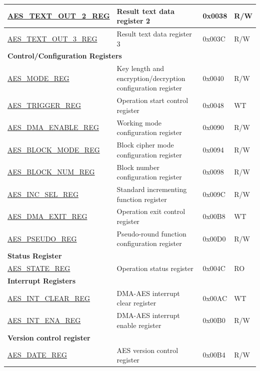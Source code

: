 \begin{longtable}{ | p{6cm} | p{7.2cm} | p{1.3cm} | p{1cm} | }
    \hyperref[regdesc:AESTEXTOUTnREG]{AES\_TEXT\_OUT\_2\_REG} & Result text data register 2 & 0x0038 & R/W \\ \hline
    \hyperref[regdesc:AESTEXTOUTnREG]{AES\_TEXT\_OUT\_3\_REG} & Result text data register 3 & 0x003C & R/W \\ \hline
    \multicolumn{4}{|l|}{\textbf{Control/Configuration Registers}} \\ \hline
    \hyperref[regdesc:AESMODEREG]{AES\_MODE\_REG} & Key length and encryption/decryption configuration register & 0x0040 & R/W \\ \hline
    \hyperref[regdesc:AESTRIGGERREG]{AES\_TRIGGER\_REG} & Operation start control register & 0x0048 & WT \\ \hline
    \hyperref[regdesc:AESDMAENABLEREG]{AES\_DMA\_ENABLE\_REG} & Working mode configuration register & 0x0090 & R/W \\ \hline
    \hyperref[regdesc:AESBLOCKMODEREG]{AES\_BLOCK\_MODE\_REG} & Block cipher mode configuration register & 0x0094 & R/W \\ \hline
    \hyperref[regdesc:AESBLOCKNUMREG]{AES\_BLOCK\_NUM\_REG} & Block number configuration register & 0x0098 & R/W \\ \hline
    \hyperref[regdesc:AESINCSELREG]{AES\_INC\_SEL\_REG} & Standard incrementing function register & 0x009C & R/W \\ \hline
    \hyperref[regdesc:AESDMAEXITREG]{AES\_DMA\_EXIT\_REG} & Operation exit control register & 0x00B8 & WT \\ \hline
\hyperref[regdesc:AESPSEUDOREG]{AES\_PSEUDO\_REG} & Pseudo-round function configuration register & 0x00D0 & R/W \\ \hline
    \multicolumn{4}{|l|}{\textbf{Status Register}} \\ \hline
    \hyperref[regdesc:AESSTATEREG]{AES\_STATE\_REG} & Operation status register & 0x004C & RO \\ \hline
    \multicolumn{4}{|l|}{\textbf{Interrupt Registers}} \\ \hline
    \hyperref[regdesc:AESINTCLEARREG]{AES\_INT\_CLEAR\_REG} & DMA-AES interrupt clear register & 0x00AC & WT \\ \hline
    \hyperref[regdesc:AESINTENAREG]{AES\_INT\_ENA\_REG} & DMA-AES interrupt enable register & 0x00B0 & R/W \\ \hline
    \multicolumn{4}{|l|}{\textbf{Version control register}} \\ \hline
    \hyperref[regdesc:AESDATEREG]{AES\_DATE\_REG} & AES version control register & 0x00B4 & R/W \\ \hline
    \end{longtable}
    